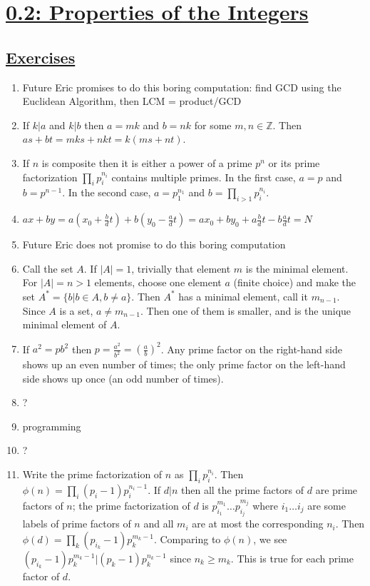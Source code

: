 \documentclass[]{article}
\newcommand{\abs}[1]{\left\vert #1 \right\vert}
\newcommand{\bbz}{\mathbb{Z}}
\begin{document}
\section*{\underline{0.2: Properties of the Integers}}
\subsection*{\underline{Exercises}}
\begin{enumerate}
\item {\color{red} Future Eric promises to do this boring computation: find GCD using the Euclidean Algorithm, then LCM = product/GCD}
\item If $k \vert a$ and $k \vert b$ then $a = mk$ and $b = nk$ for some $m,n\in\bbz$. Then $as+bt = mks + nkt = k(ms+nt)$.
\item If $n$ is composite then it is either a power of a prime $p^n$ or its prime factorization $\prod_i p_i^{n_i}$ contains multiple primes. In the first case, $a = p$ and $b = p^{n-1}$. In the second case, $a = p_1^{n_1}$ and $b = \prod_{i>1}p_i^{n_i}$.
\item $ax + by = a\left(x_0 + \frac{b}{d}t\right) + b\left(y_0 - \frac{a}{d}t\right) = ax_0 + by_0 + a\frac{b}{d}t - b\frac{a}{d}t = N$
\item {\color{red} Future Eric does not promise to do this boring computation}
\item Call the set $A$. If $\abs{A}=1$, trivially that element $m$ is the minimal element. For $\abs{A}=n>1$ elements, choose one element $a$ (finite choice) and make the set $A^* = \{b \vert b\in A, b\neq a \}$. Then $A^*$ has a minimal element, call it $m_{n-1}$. Since $A$ is a set, $a \neq m_{n-1}$. Then one of them is smaller, and is the unique minimal element of $A$.
\item If $a^2 = pb^2$ then $p = \frac{a^2}{b^2} = \left(\frac{a}{b}\right)^2$. Any prime factor on the right-hand side shows up an even number of times; the only prime factor on the left-hand side shows up once (an odd number of times).
\item {\color{red} ?}
\item {\color{red} programming}
\item {\color{red} ?}
\item Write the prime factorization of $n$ as $\prod_i p_i^{n_i}$. Then $\phi(n) = \prod_i (p_i-1)p_i^{n_i-1}$. If $d \vert n$ then all the prime factors of $d$ are prime factors of $n$; the prime factorization of $d$ is $p_{i_1}^{m_1} \ldots p_{i_j}^{m_j}$ where $i_1 \ldots i_j$ are some labels of prime factors of $n$ and all $m_i$ are at most the corresponding $n_i$. Then $\phi(d) = \prod_k (p_{i_k}-1)p_k^{m_k-1}$. Comparing to $\phi(n)$, we see $(p_{i_k}-1)p_k^{m_k-1} \vert (p_k-1)p_k^{n_k-1}$ since $n_k \geq m_k$. This is true for each prime factor of $d$.
\end{enumerate}
\end{document}
